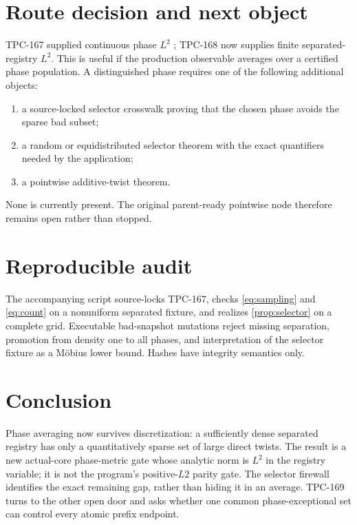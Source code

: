 \documentclass[11pt]{article}
\theoremstyle{definition}
\begin{document}
\section{Route decision and next object}

TPC-167 supplied continuous phase \(L^2\)
\citep{WangTPC167}; TPC-168 now supplies finite separated-registry
\(L^2\).  This is useful if the production observable averages over
a certified phase population.  A distinguished phase requires one
of the following additional objects:
\begin{enumerate}[label=(\roman*)]
 \item a source-locked selector crosswalk proving that the chosen
 phase avoids the sparse bad subset;
 \item a random or equidistributed selector theorem with the exact
 quantifiers needed by the application;
 \item a pointwise additive-twist theorem.
\end{enumerate}
None is currently present.  The original parent-ready pointwise node
therefore remains open rather than stopped.

\section{Reproducible audit}

The accompanying script source-locks TPC-167, checks
\eqref{eq:sampling} and \eqref{eq:count} on a nonuniform separated
fixture, and realizes \cref{prop:selector} on a complete grid.
Executable bad-snapshot mutations reject missing separation,
promotion from density one to all phases, and interpretation of the
selector fixture as a M\"obius lower bound.  Hashes have integrity
semantics only.

\section{Conclusion}

Phase averaging now survives discretization: a sufficiently dense
separated registry has only a quantitatively sparse set of large
direct twists.  The result is a new actual-core phase-metric gate
whose analytic norm is \(L^2\) in the registry variable; it is not
the program's positive-\(L2\) parity gate.  The selector firewall
identifies the exact remaining gap, rather than hiding it in an
average.  TPC-169 turns to the other open door and asks whether one
common phase-exceptional set can control every atomic prefix endpoint.



\end{document}
